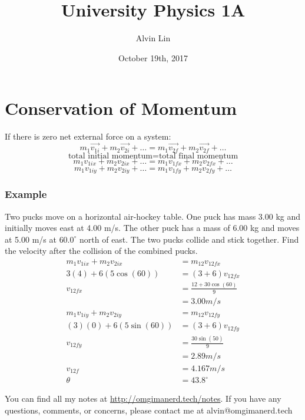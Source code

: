 \documentclass{math}
\title{University Physics 1A}
\author{Alvin Lin}
\date{October 19th, 2017}
\begin{document}
\maketitle

\section*{Conservation of Momentum}
If there is zero net external force on a system:
\[ m_1\overrightarrow{v_{1i}}+m_2\overrightarrow{v_{2i}}+\dots =
  m_1\overrightarrow{v_{2f}}+m_2\overrightarrow{v_{2f}}+\dots \]
\[ \text{total initial momentum} = \text{total final momentum} \]
\[ m_1v_{1ix}+m_2v_{2ix}+\dots = m_1v_{1fx}+m_2v_{2fx}+\dots \]
\[ m_1v_{1iy}+m_2v_{2iy}+\dots = m_1v_{1fy}+m_2v_{2fy}+\dots \]

\subsubsection*{Example}
Two pucks move on a horizontal air-hockey table. One puck has mass 3.00 kg and
initially moves east at 4.00 m/s. The other puck has a mass of 6.00 kg and
moves at 5.00 m/s at \( 60.0^{\circ} \) north of east. The two pucks collide and
stick together. Find the velocity after the collision of the combined pucks.
\begin{align*}
  m_1v_{1ix}+m_2v_{2ix} &= m_{12}v_{12fx} \\
  3(4)+6(5\cos(60)) &= (3+6)v_{12fx} \\
  v_{12fx} &= \frac{12+30\cos(60)}{9} \\
  &= 3.00m/s \\
  m_1v_{1iy}+m_2v_{2iy} &= m_{12}v_{12fy} \\
  (3)(0)+6(5\sin(60)) &= (3+6)v_{12fy} \\
  v_{12fy} &= \frac{30\sin(50)}{9} \\
  &= 2.89m/s \\
  v_{12f} &= 4.167m/s \\
  \theta &= 43.8^{\circ}
\end{align*}

\begin{center}
  You can find all my notes at \url{http://omgimanerd.tech/notes}. If you have
  any questions, comments, or concerns, please contact me at
  alvin@omgimanerd.tech
\end{center}
\end{document}
